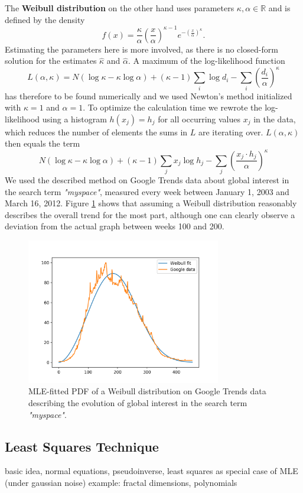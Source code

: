 \documentclass{article}
\begin{document}
The \textbf{Weibull distribution} on the other hand uses parameters $\kappa, \alpha\in \mathbb{R}$ and is defined by the density
\[f(x) = \frac{\kappa}{\alpha}\left(\frac{x}{\alpha}\right)^{\kappa-1}e^{-(\frac{x}{\alpha})^\kappa}.\]
Estimating the parameters here is more involved, as there is no closed-form solution for the estimates $\hat{\kappa}$ and $\hat{\alpha}$. A maximum of the log-likelihood function
\[L(\alpha,\kappa) = N(\log \kappa - \kappa \log \alpha) + (\kappa-1)\sum_i \log d_i - \sum_i \left(\frac{d_i}{\alpha}\right)^{\kappa}\]
has therefore to be found numerically and we used Newton's method initialized with $\kappa=1$ and $\alpha=1$. To optimize the calculation time we rewrote the log-likelihood using a histogram $h(x_j) = h_j$ for all occurring values $x_j$ in the data, which reduces the number of elements the sums in $L$ are iterating over. $L(\alpha,\kappa)$ then equals the term
\[N(\log \kappa - \kappa \log \alpha) + (\kappa-1)\sum_j x_j \log h_j - \sum_j \left(\frac{x_j\cdot h_j}{\alpha}\right)^{\kappa}\]
We used the described method on Google Trends data about global interest in the search term \emph{"myspace"}, measured every week between January 1, 2003 and March 16, 2012. Figure \ref{fig:myspace-weibull} shows that assuming a Weibull distribution reasonably describes the overall trend for the most part, although one can clearly observe a deviation from the actual graph between weeks 100 and 200.
\begin{figure}
\centering
  \centerline{\includegraphics[width=8.5cm]{img/project1/plot3}}
\caption{MLE-fitted PDF of a Weibull distribution on Google Trends data describing the evolution of global interest in the search term \emph{"myspace"}.}
\label{fig:myspace-weibull}
\end{figure}


\subsection{Least Squares Technique}
basic idea, normal equations, pseudoinverse, least squares as special case of MLE (under gaussian noise)
example: fractal dimensions, polynomials
\end{document}

